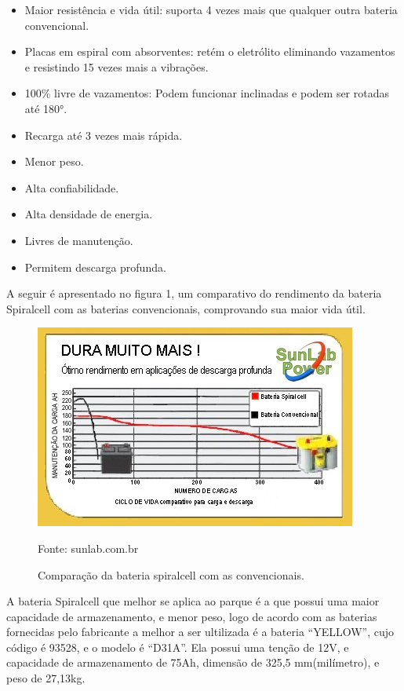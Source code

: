\begin{enumerate}
	\begin{itemize}
	\item Maior resistência e vida útil: suporta 4 vezes mais que qualquer outra bateria convencional.
	\item Placas em espiral com absorventes: retém o eletrólito eliminando vazamentos e resistindo 15 vezes mais a vibrações.
	\item 100\% livre de vazamentos: Podem funcionar inclinadas e podem ser rotadas até 180°.
	\item Recarga até 3 vezes mais rápida.	
	\item Menor peso. 
	\item Alta confiabilidade.
	\item Alta densidade de energia.
	\item Livres de manutenção.
	\item Permitem descarga profunda.
	\end{itemize}

A seguir é apresentado no figura 1, um comparativo do rendimento da bateria Spiralcell com as baterias convencionais, comprovando sua maior vida útil.

\begin{figure}[H]
	 \centering
	\label{Comparação da bateria spiralcell com as convencionais}
	 \includegraphics[keepaspectratio=true,scale=0.8]{postes/13.png}
	 \caption{Comparação da bateria spiralcell com as convencionais.}
	 \small{Fonte: sunlab.com.br}
\end{figure}

	A bateria Spiralcell que melhor se aplica ao parque é a que possui uma maior capacidade de armazenamento, e menor peso, logo de acordo com as baterias fornecidas pelo fabricante a melhor a ser ultilizada é a bateria “YELLOW”, cujo código é 93528, e o modelo é  “D31A”. Ela possui uma tenção de 12V, e capacidade de armazenamento de 75Ah, dimensão de 325,5 mm(milímetro), e peso de 27,13kg.



\end{enumerate}
